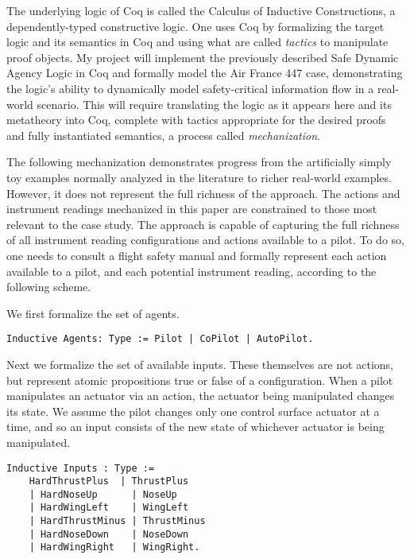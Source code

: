 The underlying logic of Coq is called the Calculus of Inductive Constructions, a dependently-typed constructive logic. One uses Coq by formalizing the target logic and its semantics in Coq and using what are called \emph{tactics} to manipulate proof objects. My project will implement the previously described Safe Dynamic Agency Logic in Coq and formally model the Air France 447 case, demonstrating the logic's ability to dynamically model safety-critical information flow in a real-world scenario. This will require translating the logic as it appears here and its metatheory into Coq, complete with tactics appropriate for the desired proofs and fully instantiated semantics, a process called \emph{mechanization}.

The following mechanization demonstrates progress from the artificially simply toy examples normally analyzed in the literature to richer real-world examples. However, it does not represent the full richness of the approach. The actions and instrument readings mechanized in this paper are constrained to those most relevant to the case study. The approach is capable of capturing the full richness of all instrument reading configurations and actions available to a pilot. To do so, one needs to consult a flight safety manual and formally represent each action available to a pilot, and each potential instrument reading, according to the following scheme.


We first formalize the set of agents.
\begin{tcolorbox}
	\begin{lstlisting}[language=Coq]
	Inductive Agents: Type := Pilot | CoPilot | AutoPilot.
	\end{lstlisting}
\end{tcolorbox}

Next we formalize the set of available inputs. These themselves are not actions, but represent atomic propositions true or false of a configuration. When a pilot manipulates an actuator via an action, the actuator being manipulated changes its state. We assume the pilot changes only one control surface actuator at a time, and so an input consists of the new state of whichever actuator is being manipulated.


\begin{tcolorbox}
	\begin{lstlisting}[language=Coq]
	Inductive Inputs : Type := 
	HardThrustPlus  | ThrustPlus 
	| HardNoseUp      | NoseUp 
	| HardWingLeft    | WingLeft
	| HardThrustMinus | ThrustMinus
	| HardNoseDown    | NoseDown 
	| HardWingRight   | WingRight.
	\end{lstlisting}
\end{tcolorbox}

